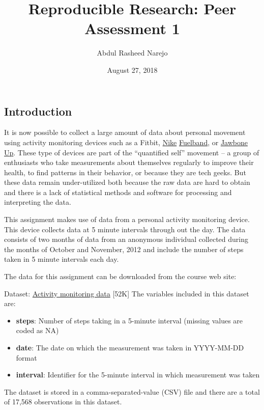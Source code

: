 \documentclass[]{article}
\title{Reproducible Research: Peer Assessment 1}
\author{Abdul Rasheed Narejo}
\date{August 27, 2018}
\providecommand{\tightlist}{%
  \setlength{\itemsep}{0pt}\setlength{\parskip}{0pt}}
\begin{document}
\maketitle

\hypertarget{introduction}{%
\subsection{Introduction}\label{introduction}}

It is now possible to collect a large amount of data about personal
movement using activity monitoring devices such as a Fitbit,
\href{http://www.fitbit.com/}{Nike}
\href{http://www.nike.com/us/en_us/c/nikeplus-fuelband}{Fuelband}, or
\href{https://jawbone.com/up}{Jawbone Up}. These type of devices are
part of the ``quantified self'' movement -- a group of enthusiasts who
take measurements about themselves regularly to improve their health, to
find patterns in their behavior, or because they are tech geeks. But
these data remain under-utilized both because the raw data are hard to
obtain and there is a lack of statistical methods and software for
processing and interpreting the data.

This assignment makes use of data from a personal activity monitoring
device. This device collects data at 5 minute intervals through out the
day. The data consists of two months of data from an anonymous
individual collected during the months of October and November, 2012 and
include the number of steps taken in 5 minute intervals each day.

The data for this assignment can be downloaded from the course web site:

Dataset:
\href{https://d396qusza40orc.cloudfront.net/repdata\%2Fdata\%2Factivity.zip}{Activity
monitoring data} {[}52K{]} The variables included in this dataset are:

\begin{itemize}
\tightlist
\item
  \textbf{steps}: Number of steps taking in a 5-minute interval (missing
  values are coded as NA)
\item
  \textbf{date}: The date on which the measurement was taken in
  YYYY-MM-DD format
\item
  \textbf{interval}: Identifier for the 5-minute interval in which
  measurement was taken
\end{itemize}

The dataset is stored in a comma-separated-value (CSV) file and there
are a total of 17,568 observations in this dataset.
\end{document}
